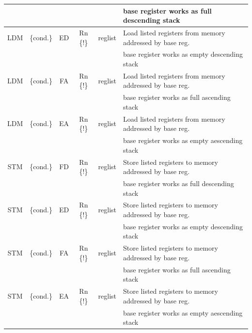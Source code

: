 {\begin{landscape}
\begin{tabular}{|c|c|c|c|c|l|}
    &           &    &          & 	  & base register works as full descending stack\\
\hline
LDM & \{cond.\} & ED & Rn \{!\} & reglist & Load listed registers from memory addressed by base reg.\\
    &           &    &          & 	  & base register works as empty descending stack\\
\hline
LDM & \{cond.\} & FA & Rn \{!\} & reglist & Load listed registers from memory addressed by base reg.\\
    &           &    &          & 	  & base register works as full ascending stack\\
\hline
LDM & \{cond.\} & EA & Rn \{!\} & reglist & Load listed registers from memory addressed by base reg.\\
    &           &    &          & 	  & base register works as empty aescending stack\\
\hline
\hline
STM & \{cond.\} & FD & Rn \{!\} & reglist & Store listed registers to memory addressed by base reg.\\
    &           &    &          & 	  & base register works as full descending stack\\
\hline
STM & \{cond.\} & ED & Rn \{!\} & reglist & Store listed registers to memory addressed by base reg.\\
    &           &    &          & 	  & base register works as empty descending stack\\
\hline
STM & \{cond.\} & FA & Rn \{!\} & reglist & Store listed registers to memory addressed by base reg.\\
    &           &    &          & 	  & base register works as full ascending stack\\
\hline
STM & \{cond.\} & EA & Rn \{!\} & reglist & Store listed registers to memory addressed by base reg.\\
    &           &    &          & 	  & base register works as empty aescending stack\\
\hline
\end{tabular}
\bigskip

\newpage

\end{landscape}}
